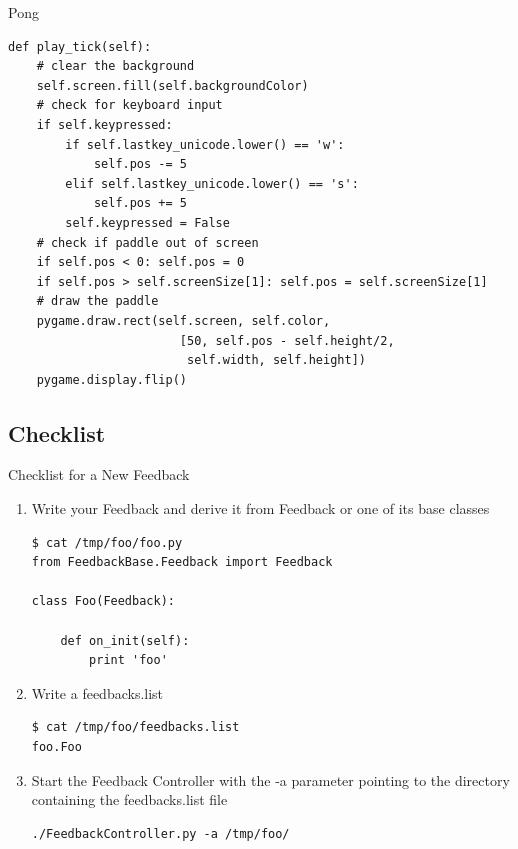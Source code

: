 \documentclass{beamer}
\begin{document}
\begin{frame}[fragile]{Pong}
    \begin{lstlisting}
def play_tick(self):
    # clear the background
    self.screen.fill(self.backgroundColor)
    # check for keyboard input
    if self.keypressed:
        if self.lastkey_unicode.lower() == 'w':
            self.pos -= 5
        elif self.lastkey_unicode.lower() == 's':
            self.pos += 5
        self.keypressed = False
    # check if paddle out of screen
    if self.pos < 0: self.pos = 0
    if self.pos > self.screenSize[1]: self.pos = self.screenSize[1]
    # draw the paddle
    pygame.draw.rect(self.screen, self.color,
                        [50, self.pos - self.height/2,
                         self.width, self.height])
    pygame.display.flip()
    \end{lstlisting}
\end{frame}

\subsection{Checklist}
\begin{frame}[fragile]{Checklist for a New Feedback}
    \begin{enumerate}
        \item Write your Feedback and derive it from \alert{Feedback} or one of
            its base classes
            \begin{lstlisting}
$ cat /tmp/foo/foo.py
from FeedbackBase.Feedback import Feedback

class Foo(Feedback):

    def on_init(self):
        print 'foo'
            \end{lstlisting}
        \pause
        \item Write a \alert{feedbacks.list}
            \begin{lstlisting}
$ cat /tmp/foo/feedbacks.list
foo.Foo
            \end{lstlisting}
        \pause
        \item Start the Feedback Controller with the \alert{-a} parameter
            pointing to the directory containing the \alert{feedbacks.list}
            file
            \begin{lstlisting}
./FeedbackController.py -a /tmp/foo/
            \end{lstlisting}
    \end{enumerate}
\end{frame}
\end{document}
